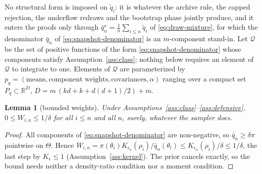 \documentclass[10pt]{article}
\theoremstyle{plain}
\newtheorem{lemma}[theorem]{Lemma}
\theoremstyle{definition}
\begin{document}
No structural form is imposed on $\tilde q_i$: it is whatever the archive rule, the capped rejection, the underflow redraws and the bootstrap phase jointly produce, and it enters the proofs only through $\bar q^\star_n=\tfrac1n\sum_{i\le n}\tilde q_i$ of \eqref{eq:draw-mixture}, for which the denominator $\bar q_n$ of \eqref{eq:snapshot-denominator} is an $m$-component stand-in. Let $\mathcal{Q}$ be the set of positive functions of the form \eqref{eq:snapshot-denominator} whose components satisfy Assumption~\ref{ass:class}; nothing below requires an element of $\mathcal{Q}$ to integrate to one. Elements of $\mathcal{Q}$ are parameterized by $p_q=(\text{means},\text{component weights},\text{covariances},\alpha)$ ranging over a compact set $P_q\subset\mathbb{R}^{D}$, $D=m\,(kd+k+d(d+1)/2)+m$.

\begin{lemma}[bounded weights]\label{lem:bounded}
Under Assumptions~\ref{ass:class}--\ref{ass:defensive}, $0\le W_{i,n}\le1/\delta$ for all $i\le n$ and all $n$, surely, whatever the sampler does.
\end{lemma}
\begin{proof}
All components of \eqref{eq:snapshot-denominator} are non-negative, so $\bar q_n\ge\delta\pi$ pointwise on $\Theta$. Hence $W_{i,n}=\pi(\theta_i)K_{\epsilon_n}(\rho_i)/\bar q_n(\theta_i)\le K_{\epsilon_n}(\rho_i)/\delta\le1/\delta$, the last step by $K_\epsilon\le1$ (Assumption~\ref{ass:kernel}). The prior cancels exactly, so the bound needs neither a density-ratio condition nor a moment condition.
\end{proof}
\end{document}
